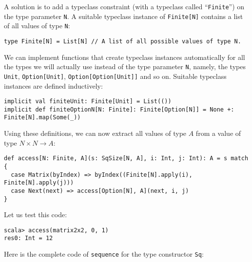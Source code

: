 A solution is to add a typeclass constraint (with a typeclass called
\textsf{``}\lstinline!Finite!\textsf{''}) on the type parameter \lstinline!N!. A
suitable typeclass instance of \lstinline!Finite[N]! contains a list
of all values of type \lstinline!N!:
\begin{lstlisting}
type Finite[N] = List[N] // A list of all possible values of type N.
\end{lstlisting}
We can implement functions that create typeclass instances automatically
for all the types we will actually use instead of the type parameter
\lstinline!N!, namely, the types \lstinline!Unit!, \lstinline!Option[Unit]!,
\lstinline!Option[Option[Unit]]! and so on. Suitable typeclass instances
are defined inductively:
\begin{lstlisting}
implicit val finiteUnit: Finite[Unit] = List(())
implicit def finiteOptionN[N: Finite]: Finite[Option[N]] = None +: Finite[N].map(Some(_))
\end{lstlisting}

Using these definitions, we can now extract all values of type $A$
from a value of type $N\times N\rightarrow A$:
\begin{lstlisting}
def access[N: Finite, A](s: SqSize[N, A], i: Int, j: Int): A = s match {
  case Matrix(byIndex) => byIndex((Finite[N].apply(i), Finite[N].apply(j)))
  case Next(next) => access[Option[N], A](next, i, j)
}
\end{lstlisting}
Let us test this code:
\begin{lstlisting}
scala> access(matrix2x2, 0, 1)
res0: Int = 12
\end{lstlisting}

Here is the complete code of \lstinline!sequence! for the type constructor
\lstinline!Sq!:

